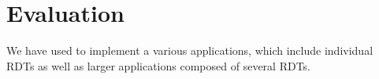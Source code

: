 \section{Evaluation}
\label{sec:evaluation}

We have used \name to implement a various applications, which include
individual RDTs as well as larger applications composed of several
RDTs.
